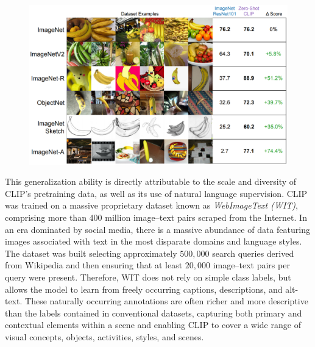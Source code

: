 \documentclass[a4paper, oneside, english]{sapthesis} %
\begin{document}
\begin{figure}[h]
    \centering
    \includegraphics[width=\textwidth]{img/CLIP_zero_shot.png}
    \caption{}
    \label{fig:clipzs2}
\end{figure}

This generalization ability is directly attributable to the scale and diversity of CLIP's pretraining data, as well as its use of natural language supervision. CLIP was trained on a massive proprietary dataset known as \emph{WebImageText (WIT)}, comprising more than $400$ million image–text pairs scraped from the Internet. In an era dominated by social media, there is a massive abundance of data featuring images associated with text in the most disparate domains and language styles. The dataset was built selecting approximately $500,000$ search queries derived from Wikipedia and then ensuring that at least $20,000$ image–text pairs per query were present. Therefore, WIT does not rely on simple class labels, but allows the model to learn from freely occurring captions, descriptions, and alt-text. These naturally occurring annotations are often richer and more descriptive than the labels contained in conventional datasets, capturing both primary and contextual elements within a scene and enabling CLIP to cover a wide range of visual concepts, objects, activities, styles, and scenes.

\end{document}
